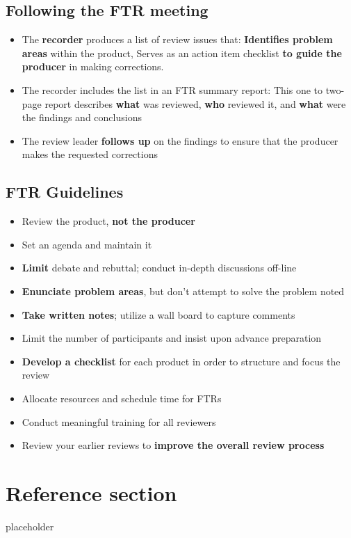 \documentclass{article}
\begin{document}
\subsection{Following the FTR meeting}

\begin{itemize}
  \item The \textbf{recorder} produces a list of review issues that: \textbf{Identifies problem areas} within the product, Serves as an action item checklist \textbf{to guide the producer} in making corrections.
  \item The recorder includes the list in an FTR summary report: This one to two-page report describes \textbf{what} was reviewed, \textbf{who} reviewed it, and \textbf{what} were the findings and conclusions
  \item The review leader \textbf{follows up} on the findings to ensure that the producer makes the requested corrections
\end{itemize}

\subsection{FTR Guidelines}

\begin{itemize}
  \item Review the product, \textbf{not the producer}
  \item Set an agenda and maintain it
  \item \textbf{Limit} debate and rebuttal; conduct in-depth discussions off-line
  \item \textbf{Enunciate problem areas}, but don't attempt to solve the problem noted
  \item \textbf{Take written notes}; utilize a wall board to capture comments
  \item Limit the number of participants and insist upon advance preparation
  \item \textbf{Develop a checklist} for each product in order to structure and focus the review
  \item Allocate resources and schedule time for FTRs
  \item Conduct meaningful training for all reviewers
  \item Review your earlier reviews to \textbf{improve the overall review process}
\end{itemize}

\pagebreak
\section*{Reference section} \label{sec:reference}
\begin{description}
	\item[placeholder] \hfill \\
\end{description}
\end{document}
